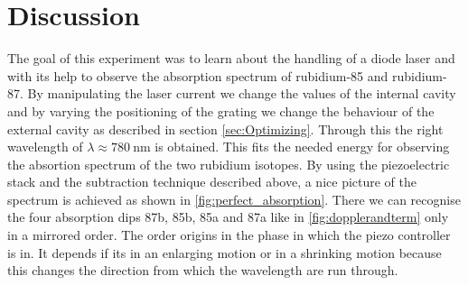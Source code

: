 \section{Discussion}
\label{sec:Diskussion}

The goal of this experiment was to learn about the handling of a diode laser and with its help to observe the absorption spectrum of rubidium-85 and rubidium-87.
By manipulating the laser current we change the values of the internal cavity and by varying the positioning of the grating we change the behaviour of the external cavity as described in section \ref{sec:Optimizing}. Through this the right wavelength of $\lambda \approx \SI{780}{\nano\meter}$ is obtained. This fits the needed energy for observing the absortion spectrum of the two rubidium isotopes. By using the piezoelectric stack and the subtraction technique described above, a nice picture of the spectrum is achieved as shown in \ref{fig:perfect_absorption}. There we can recognise the four absorption dips 87b, 85b, 85a and 87a like in \ref{fig:dopplerandterm} only in a mirrored order. The order origins in the phase in which the piezo controller is in. It depends if its in an enlarging motion or in a shrinking motion because this changes the direction from which the wavelength are run through.
